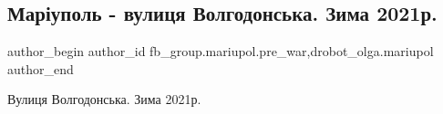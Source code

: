  
 
 
 
 
 
\subsection{Маріуполь - вулиця Волгодонська. Зима 2021р.}
\label{sec:17_01_2023.fb.fb_group.mariupol.pre_war.1.volgodonska_2021}
 
\ifcmt
 author_begin
   author_id fb_group.mariupol.pre_war,drobot_olga.mariupol
 author_end
\fi

Вулиця Волгодонська. Зима 2021р.
